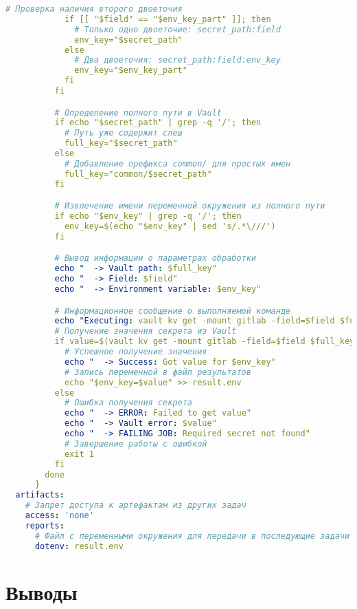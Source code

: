 \begin{lstlisting}[language=yaml,label={lst:component-template}]
            # Проверка наличия второго двоеточия
            if [[ "$field" == "$env_key_part" ]]; then
              # Только одно двоеточие: secret_path:field
              env_key="$secret_path"
            else
              # Два двоеточия: secret_path:field:env_key
              env_key="$env_key_part"
            fi
          fi

          # Определение полного пути в Vault
          if echo "$secret_path" | grep -q '/'; then
            # Путь уже содержит слеш
            full_key="$secret_path"
          else
            # Добавление префикса common/ для простых имен
            full_key="common/$secret_path"
          fi

          # Извлечение имени переменной окружения из полного пути
          if echo "$env_key" | grep -q '/'; then
            env_key=$(echo "$env_key" | sed 's/.*\///')
          fi

          # Вывод информации о параметрах обработки
          echo "  -> Vault path: $full_key"
          echo "  -> Field: $field"
          echo "  -> Environment variable: $env_key"

          # Информационное сообщение о выполняемой команде
          echo "Executing: vault kv get -mount gitlab -field=$field $full_key"
          # Получение значения секрета из Vault
          if value=$(vault kv get -mount gitlab -field=$field $full_key 2>&1); then
            # Успешное получение значения
            echo "  -> Success: Got value for $env_key"
            # Запись переменной в файл результатов
            echo "$env_key=$value" >> result.env
          else
            # Ошибка получения секрета
            echo "  -> ERROR: Failed to get value"
            echo "  -> Vault error: $value"
            echo "  -> FAILING JOB: Required secret not found"
            # Завершение работы с ошибкой
            exit 1
          fi
        done
      }
  artifacts:
    # Запрет доступа к артефактам из других задач
    access: 'none'
    reports:
      # Файл с переменными окружения для передачи в последующие задачи
      dotenv: result.env
\end{lstlisting}

\section{Выводы} \label{sec:conclusion}

